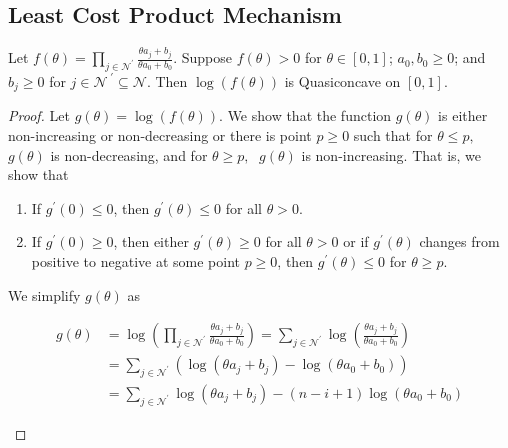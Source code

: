 \documentclass[letterpaper]{article} %
\theoremstyle{definition}
\newenvironment{customlemma}[1]
  {\renewcommand\theinnercustomlemma{#1}\innercustomlemma}
  {\endinnercustomlemma}
\begin{document}
\subsection{Least Cost Product Mechanism}


\begin{customlemma}{3}
Let $f(\theta) = \displaystyle \prod_{j \in \mathcal{N}^{'}} \displaystyle \frac{\theta a_{j} + b_{j}}{\theta a_{0} + b_{0}}$.  Suppose $f(\theta) > 0$ for $\theta \in [0,1]$; $a_{0}, b_{0} \geq 0$; and $b_{j} \geq 0$ for $j \in \mathcal{N}^{\;'} \subseteq \mathcal{N}$. Then $\log(f(\theta))$ is Quasiconcave on $[0,1]$.
\end{customlemma}

\begin{proof}
Let $g(\theta) = \log(f(\theta))$. We show that the function $g(\theta)$ is either non-increasing or non-decreasing or there is point $p \geq 0$ such that for $\theta \leq p ,\;$ $g(\theta)$ is non-decreasing, and for $\theta \geq p,\;$ $g(\theta)$ is non-increasing. That is, we show that 
\begin{enumerate}
    \item If $g^{'}(0) \leq 0$, then $g^{'}(\theta) \leq 0$ for all $\theta > 0$.
    
    \item If $g^{'}(0) \geq 0$, then either $g^{'}(\theta) \geq 0$ for all $\theta > 0$ or if $g^{'}(\theta)$ changes from positive to negative at some point $p \geq 0$, then $g^{'}(\theta) \leq 0$ for $\theta \geq p$.
\end{enumerate}

\noindent We simplify $g(\theta)$ as
\begin{linenomath}
\begin{equation*}
\begin{split}
g(\theta) & = \log\left(\displaystyle \prod_{j \in \mathcal{N}^{'}} \displaystyle \frac{\theta a_{j} + b_{j}}{\theta a_{0} + b_{0}} \right) = \displaystyle \sum_{j \in \mathcal{N}^{'}} \log\left(\displaystyle \frac{\theta a_{j} + b_{j}}{\theta a_{0} + b_{0}} \right)
\\[4 pt] & = \displaystyle \sum_{j \in \mathcal{N}^{'}} \left( \log(\theta a_{j} + b_{j}) - \log(\theta a_{0} + b_{0}) \right)
\\[4 pt] & = \displaystyle \sum_{j \in \mathcal{N}^{'}} \log(\theta a_{j} + b_{j}) - (n - i + 1) \log(\theta a_{0} +b_{0}) 
\end{split}
\end{equation*}
\end{linenomath}


\end{proof}
\end{document}
